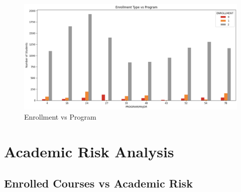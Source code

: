 \documentclass[12pt]{article}
\begin{document}
\begin{figure}[H]
    \centering
    \includegraphics[width=1\linewidth]{enrollment.png}
    \caption{Enrollment vs Program}
\end{figure}

\section{Academic Risk Analysis}

\subsection{Enrolled Courses vs Academic Risk}
\end{document}
